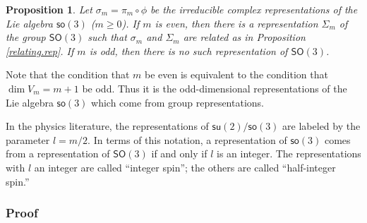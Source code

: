 \documentclass[12pt]{amsbook}
\theoremstyle{plain}
\newtheorem{proposition}[theorem]{Proposition}
\numberwithin{equation}{chapter}
\numberwithin{theorem}{chapter}
\begin{document}
\begin{proposition}
\label{so3.odd}Let $\sigma_{m}=\pi_{m}\circ\phi$ be the irreducible complex
representations of the Lie algebra $\mathsf{so}(3)$ ($m\geq0$). If $m$ is
even, then there is a representation $\Sigma_{m}$ of the group $\mathsf{SO}%
(3)$ such that $\sigma_{m}$ and $\Sigma_{m}$ are related as in Proposition
\ref{relating.rep}. If $m$ is odd, then there is no such representation of
$\mathsf{SO}(3)$.
\end{proposition}

Note that the condition that $m$ be even is equivalent to the condition that
$\dim V_{m}=m+1$ be odd. Thus it is the odd-dimensional representations of the
Lie algebra $\mathsf{so}(3)$ which come from group representations.

In the physics literature, the representations of $\mathsf{su}(2)/\mathsf{so}%
(3)$ are labeled by the parameter $l=m/2$. In terms of this notation, a
representation of $\mathsf{so}(3)$ comes from a representation of
$\mathsf{SO}(3)$ if and only if $l$ is an integer. The representations with
$l$ an integer are called ``integer spin''; the others are called
``half-integer spin.''

\subsubsection{Proof}
\end{document}
